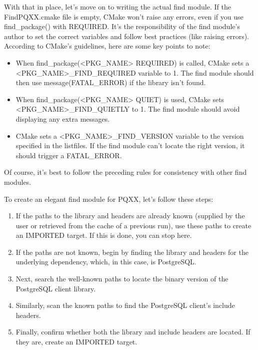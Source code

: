 

With that in place, let’s move on to writing the actual find module. If the FindPQXX.cmake file is empty, CMake won’t raise any errors, even if you use find\_package() with REQUIRED. It’s the responsibility of the find module’s author to set the correct variables and follow best practices (like raising errors). According to CMake’s guidelines, here are some key points to note:

\begin{itemize}
\item
When find\_package(<PKG\_NAME> REQUIRED) is called, CMake sets a <PKG\_NAME>\_FIND\_REQUIRED variable to 1. The find module should then use message(FATAL\_ERROR) if the library isn’t found.

\item
When find\_package(<PKG\_NAME> QUIET) is used, CMake sets <PKG\_NAME>\_FIND\_QUIETLY to 1. The find module should avoid displaying any extra messages.

\item
CMake sets a <PKG\_NAME>\_FIND\_VERSION variable to the version specified in the listfiles. If the find module can’t locate the right version, it should trigger a FATAL\_ERROR.
\end{itemize}

Of course, it’s best to follow the preceding rules for consistency with other find modules.

To create an elegant find module for PQXX, let’s follow these steps:

\begin{enumerate}
\item
If the paths to the library and headers are already known (supplied by the user or retrieved from the cache of a previous run), use these paths to create an IMPORTED target. If this is done, you can stop here.

\item
If the paths are not known, begin by finding the library and headers for the underlying dependency, which, in this case, is PostgreSQL.

\item
Next, search the well-known paths to locate the binary version of the PostgreSQL client library.

\item
Similarly, scan the known paths to find the PostgreSQL client’s include headers.

\item
Finally, confirm whether both the library and include headers are located. If they are, create an IMPORTED target.
\end{enumerate}

